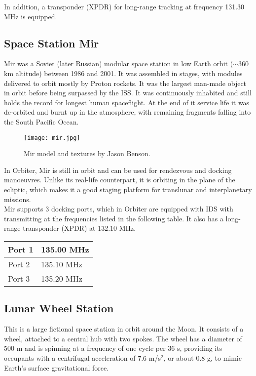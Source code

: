 \documentclass[Orbiter User Manual.tex]{subfiles}
\begin{document}
\noindent
In addition, a transponder (XPDR) for long-range tracking at frequency 131.30 MHz is equipped.


\subsection{Space Station Mir}
Mir was a Soviet (later Russian) modular space station in low Earth orbit ($\sim$360 km altitude) between 1986 and 2001. It was assembled in stages, with modules delivered to orbit mostly by Proton rockets. It was the largest man-made object in orbit before being surpassed by the ISS. It was continuously inhabited and still holds the record for longest human spaceflight. At the end of it service life it was de-orbited and burnt up in the atmosphere, with remaining fragments falling into the South Pacific Ocean.\\

\begin{figure}[H]
  \centering
  \texttt{[image: mir.jpg]}
  \caption{Mir model and textures by Jason Benson.}
\end{figure}

\noindent
In Orbiter, Mir is still in orbit and can be used for rendezvous and docking manoeuvres. Unlike its real-life counterpart, it is orbiting in the plane of the ecliptic, which makes it a good staging platform for translunar and interplanetary missions.\\
Mir supports 3 docking ports, which in Orbiter are equipped with IDS with transmitting at the frequencies listed in the following table. It also has a long-range transponder (XPDR) at 132.10 MHz.

	\begin{longtable}{ |p{}|p{}| }
	\hline\rule{0pt}{2ex}
	Port 1 & 135.00  MHz\\
	\hline\rule{0pt}{2ex}
	Port 2 & 135.10  MHz\\
	\hline\rule{0pt}{2ex}
	Port 3 & 135.20  MHz\\
	\hline
	\end{longtable}


\subsection{Lunar Wheel Station}
This is a large fictional space station in orbit around the Moon. It consists of a wheel, attached to a central hub with two spokes. The wheel has a diameter of 500 m and is spinning at a frequency of one cycle per 36 s, providing its occupants with a centrifugal acceleration of 7.6 m/s$^{2}$, or about 0.8 g, to mimic Earth's surface gravitational force.
\end{document}
